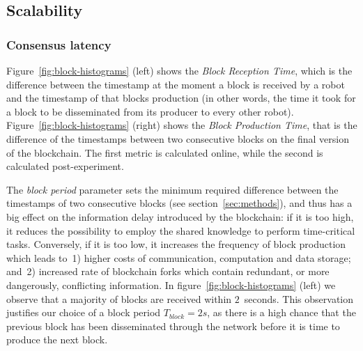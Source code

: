 \documentclass[runningheads]{llncs}
\begin{document}


\subsection{Scalability}
\label{ssec:scalability}

\subsubsection{Consensus latency}

 Figure~\ref{fig:block-histograms} (left) shows the \emph{Block Reception Time}, which is the difference between the timestamp at the moment a block is received by a robot and the timestamp of that blocks production (in other words, the time it took for a block to be disseminated from its producer to every other robot). Figure~\ref{fig:block-histograms} (right) shows the \emph{Block Production Time}, that is the difference of the timestamps between two consecutive blocks on the final version of the blockchain. The first metric is calculated online, while the second is calculated post-experiment.
 
The \emph{block period} parameter sets the minimum required difference between the timestamps of two consecutive blocks (see section~\ref{sec:methods}), and thus has a big effect on the information delay introduced by the blockchain: if it is too high, it reduces the possibility to employ the shared knowledge to perform time-critical tasks. Conversely, if it is too low, it increases the frequency of block production which leads to~1) higher costs of communication, computation and data storage; and~2) increased rate of blockchain forks which contain redundant, or more dangerously, conflicting information.
 In figure~\ref{fig:block-histograms} (left) we observe that a majority of blocks are received within $2$~seconds. This observation justifies our choice of a block period $T_{block}=2s$, as there is a high chance that the previous block has been disseminated through the network before it is time to produce the next block.
\end{document}
